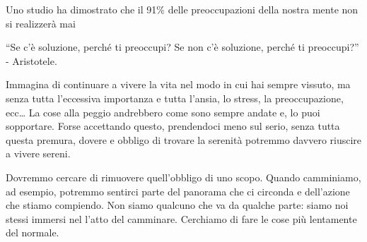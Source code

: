 \documentclass[12pt]{book} %
\begin{document}
Uno studio ha dimostrato che il 91\% delle preoccupazioni della nostra mente non si realizzerà
mai

“Se c'è soluzione, perché ti preoccupi? Se non c'è soluzione, perché ti preoccupi?” - Aristotele.

Immagina di continuare a vivere la vita nel modo in cui hai sempre vissuto, ma senza tutta l'eccessiva importanza e tutta l'ansia, lo stress, la preoccupazione, ecc… La cose alla peggio andrebbero come sono sempre andate e, lo puoi sopportare. Forse accettando questo, prendendoci meno sul serio, senza tutta questa premura, dovere e obbligo di trovare la serenità potremmo davvero riuscire a vivere sereni.

Dovremmo cercare di rimuovere quell'obbligo di uno scopo. Quando camminiamo, ad esempio, potremmo sentirci parte del panorama che ci circonda e dell'azione che stiamo compiendo.
Non siamo qualcuno che va da qualche parte: siamo noi stessi immersi nel l'atto del camminare. 
Cerchiamo di fare le cose più lentamente del normale.
\end{document}
